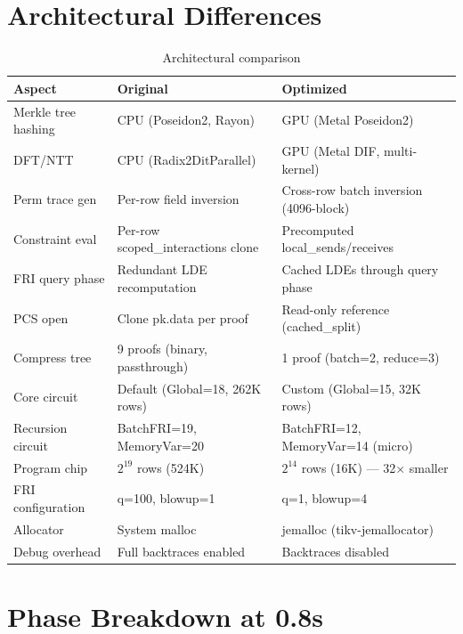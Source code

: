 \documentclass[11pt,a4paper]{article}
\begin{document}
\section{Architectural Differences}

\begin{table}[h]
\centering
\small
\begin{tabular}{@{}L{3.5cm}L{4.5cm}L{5.5cm}@{}}
\toprule
\textbf{Aspect} & \textbf{Original} & \textbf{Optimized} \\
\midrule
Merkle tree hashing & CPU (Poseidon2, Rayon) & GPU (Metal Poseidon2) \\
DFT/NTT & CPU (Radix2DitParallel) & GPU (Metal DIF, multi-kernel) \\
Perm trace gen & Per-row field inversion & Cross-row batch inversion (4096-block) \\
Constraint eval & Per-row scoped\_interactions clone & Precomputed local\_sends/receives \\
FRI query phase & Redundant LDE recomputation & Cached LDEs through query phase \\
PCS open & Clone pk.data per proof & Read-only reference (cached\_split) \\
Compress tree & 9 proofs (binary, passthrough) & 1 proof (batch=2, reduce=3) \\
Core circuit & Default (Global=18, 262K rows) & Custom (Global=15, 32K rows) \\
Recursion circuit & BatchFRI=19, MemoryVar=20 & BatchFRI=12, MemoryVar=14 (micro) \\
Program chip & $2^{19}$ rows (524K) & $2^{14}$ rows (16K) --- 32$\times$ smaller \\
FRI configuration & q=100, blowup=1 & q=1, blowup=4 \\
Allocator & System malloc & jemalloc (tikv-jemallocator) \\
Debug overhead & Full backtraces enabled & Backtraces disabled \\
\bottomrule
\end{tabular}
\caption{Architectural comparison}
\end{table}

\section{Phase Breakdown at 0.8s}
\end{document}
